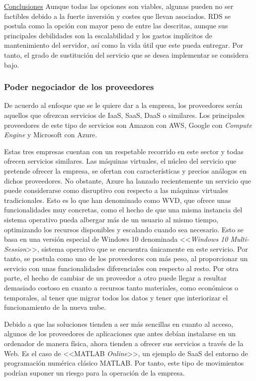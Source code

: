 \noindent\underline{Conclusiones}\newline
\indent Aunque todas las opciones son viables, algunas pueden no ser factibles debido a la fuerte inversión y costes que llevan asociados. \acs{RDS} se postula como la opción con mayor peso de entre las descritas, aunque sus principales debilidades son la escalabilidad y los gastos implícitos de mantenimiento del servidor, así como la vida útil que este pueda entregar. Por tanto, el grado de sustitución del servicio que se desea implementar se considera bajo.

\subsubsection{Poder negociador de los proveedores}
De acuerdo al enfoque que se le quiere dar a la empresa, los proveedores serán aquellos que ofrezcan servicios de \acs{IaaS}, \acs{SaaS}, \acs{DaaS} o similares. Los principales proveedores de este tipo de servicios son Amazon con \acf{AWS}, Google con \textit{Compute Engine} y Microsoft con Azure.

Estas tres empresas cuentan con un respetable recorrido en este sector y todas ofrecen servicios similares. Las máquinas virtuales, el núcleo del servicio que pretende ofrecer la empresa, se ofertan con características y precios análogos en dichos proveedores. No obstante, Azure ha lanzado recientemente un servicio que puede considerarse como disruptivo con respecto a las máquinas virtuales tradicionales. Esto es lo que han denominado como \acs{WVD}, que ofrece unas funcionalidades muy concretas, como el hecho de que una misma instancia del sistema operativo pueda albergar más de un usuario al mismo tiempo, optimizando los recursos disponibles y escalando cuando sea necesario. Esto se basa en una versión especial de Windows 10 denominada <<\textit{Windows 10 Multi-Session}>>, sistema operativo que se encuentra únicamente en este servicio. Por tanto, se postula como uno de los proveedores con más peso, al proporcionar un servicio con unas funcionalidades diferenciales con respecto al resto. Por otra parte, el hecho de cambiar de un proveedor a otro puede llegar a resultar demasiado costoso en cuanto a recursos tanto materiales, como económicos o temporales, al tener que migrar todos los datos y tener que interiorizar el funcionamiento de la nueva nube.

Debido a que las soluciones tienden a ser más sencillas en cuanto al acceso, algunos de los proveedores de aplicaciones que antes debían instalarse en un ordenador de manera física, ahora tienden a ofrecer sus servicios a través de la Web. Es el caso de <<MATLAB \textit{Online}>>, un ejemplo de \acs{SaaS} del entorno de programación numérica clásico MATLAB. Por tanto, este tipo de movimientos podrían suponer un riesgo para la operación de la empresa.

